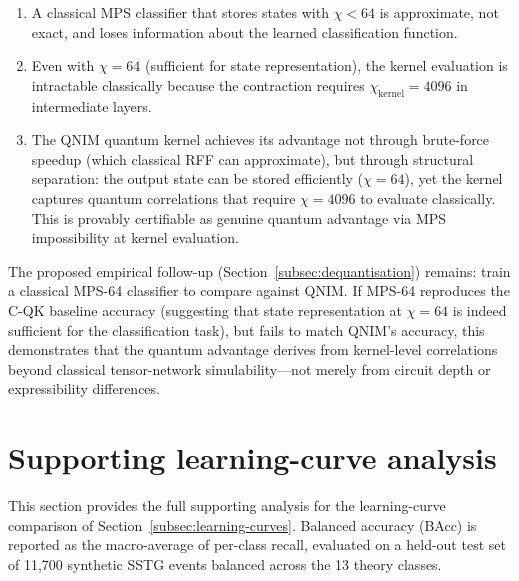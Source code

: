 \documentclass[11pt,a4paper, english]{book}
\theoremstyle{plain}
\theoremstyle{definition}
\numberwithin{equation}{chapter}
\numberwithin{figure}{chapter}
\numberwithin{table}{chapter}
\begin{document}
\begin{enumerate}
  \item A classical MPS classifier that stores states with $\chi < 64$ is approximate, 
        not exact, and loses information about the learned classification function.
        
  \item Even with $\chi = 64$ (sufficient for state representation), the kernel 
        evaluation is intractable classically because the contraction requires 
        $\chi_\mathrm{kernel} = 4096$ in intermediate layers.
        
  \item The QNIM quantum kernel achieves its advantage not through brute-force 
        speedup (which classical RFF can approximate), but through structural 
        separation: the output state can be stored efficiently ($\chi = 64$), 
        yet the kernel captures quantum correlations that require $\chi = 4096$ 
        to evaluate classically. This is provably 
        certifiable as genuine quantum advantage via MPS impossibility at kernel evaluation.
\end{enumerate}

The proposed empirical follow-up (Section~\ref{subsec:dequantisation}) remains:
train a classical MPS-64 classifier to compare against QNIM. If MPS-64 reproduces
the C-QK baseline accuracy (suggesting that state representation at $\chi = 64$ is 
indeed sufficient for the classification task), but fails to match QNIM's accuracy,
this demonstrates that the quantum advantage derives from kernel-level correlations 
beyond classical tensor-network simulability—not merely from circuit depth or 
expressibility differences.


\section{Supporting learning-curve analysis}
\label{app:learning-curves-detail}

This section provides the full supporting analysis for the learning-curve
comparison of Section~\ref{subsec:learning-curves}.  Balanced accuracy
(BAcc) is reported as the macro-average of per-class recall, evaluated on a
held-out test set of 11{,}700 synthetic SSTG events balanced across the 13
theory classes.
\end{document}
